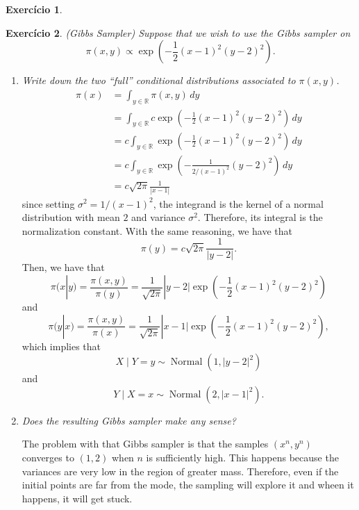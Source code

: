 \documentclass[a4paper,12pt]{article}
\newcommand{\R}{\mathbb{R}}
\newtheorem{exercise}{Exercício}
\theoremstyle{definition}
\begin{document}
\begin{exercise}
    
\end{exercise}

\begin{exercise}
    (Gibbs Sampler) 
    Suppose that we wish to use the Gibbs sampler on
    $$
    \pi(x,y) \propto \exp\left(-\frac{1}{2}(x-1)^2(y-2)^2\right).
    $$
\end{exercise}

\begin{enumerate}
    \item {\it Write down the two ``full'' conditional distributions associated to $\pi(x, y)$.}
    \begin{equation*}
        \begin{split}
            \pi(x) &= \int_{y \in \R} \pi(x,y) \, dy\\
            &= \int_{y \in \R} c\exp\left(-\frac{1}{2}(x-1)^2(y-2)^2\right)\,dy \\
            &= c\int_{y \in \R} \exp\left(-\frac{1}{2}(x-1)^2(y-2)^2\right)\,dy \\
            &= c\int_{y \in \R} \exp\left(-\frac{1}{2/(x-1)^2} (y-2)^2\right)\,dy \\
            &= c\sqrt{2\pi}\frac{1}{|x - 1|}
        \end{split}
    \end{equation*}
    since setting $\sigma^2 = 1/(x-1)^2$, the integrand is the kernel of a
    normal distribution with mean $2$ and variance $\sigma^2$. Therefore, its
    integral is the normalization constant. With the same reasoning, we have
    that 
    $$
    \pi(y) = c\sqrt{2\pi}\frac{1}{|y-2|}.
    $$
    Then, we have that 
    $$
    \pi(x|y) = \frac{\pi(x,y)}{\pi(y)} = \frac{1}{\sqrt{2\pi}}|y-2|\exp\left(-\frac{1}{2}(x-1)^2(y-2)^2\right) 
    $$
    and 
    $$
    \pi(y|x) = \frac{\pi(x,y)}{\pi(x)} = \frac{1}{\sqrt{2\pi}}|x-1|\exp\left(-\frac{1}{2}(x-1)^2(y-2)^2\right),
    $$
    which implies that 
    $$
    X \mid Y = y \sim \operatorname{Normal}(1, |y-2|^2)
    $$
    and 
    $$
    Y \mid X = x \sim \operatorname{Normal}(2, |x-1|^2).
    $$ 
    
    \item {\it Does the resulting Gibbs sampler make any sense?}
    
    The problem with that Gibbs sampler is that the samples $(x^n, y^n)$
    converges to $(1,2)$ when $n$ is sufficiently high. This happens because
    the variances are very low in the region of greater mass. Therefore, even
    if the initial points are far from the mode, the sampling will explore it
    and wheen it happens, it will get stuck. 
\end{enumerate}
\end{document}
